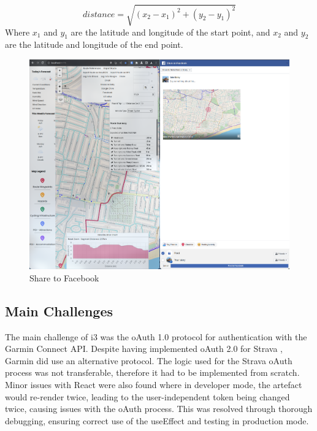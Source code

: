 \begin{equation}
  \label{iteration3:euclidian-distance}
  distance = \sqrt{(x_2 - x_1)^2 + (y_2 - y_1)^2}
\end{equation}
Where $x_1$ and $y_1$ are the latitude and longitude of the start point, and $x_2$ and $y_2$ are the latitude and longitude of the end point.

\begin{figure}[!ht]
  \centering
  \includegraphics[width=425px]{figures/Progress Images/Iteration-3/SR51/SR51-Share to Facebook.png}
  \caption{Share to Facebook}
  \label{fig:facebook-share}
\end{figure}

\subsection{Main Challenges}
\label{iteration3:main-challenges}

The main challenge of i3 was the oAuth 1.0 protocol for authentication with the Garmin Connect API. Despite having implemented oAuth 2.0 for Strava , Garmin did use an alternative protocol. The logic used for the Strava oAuth process was not transferable, therefore it had to be implemented from scratch. Minor issues with React were also found where in developer mode, the artefact would re-render twice, leading to the user-independent token being changed twice, causing issues with the oAuth process. This was resolved through thorough debugging, ensuring correct use of the useEffect and testing in production mode.